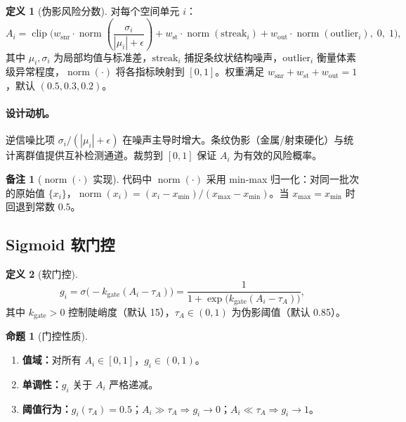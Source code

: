 \documentclass[11pt,a4paper]{article}
\newcommand{\sigmoid}{\sigma}
\newcommand{\clip}{\operatorname{clip}}
\newcommand{\normop}{\operatorname{norm}}
\theoremstyle{definition}
\newtheorem{definition}{定义}[section]
\newtheorem{proposition}{命题}[section]
\newtheorem{remark}{备注}[section]
\begin{document}
\begin{definition}[伪影风险分数]
对每个空间单元 $i$：
\begin{equation}\label{eq:artifact}
A_i = \clip\!\Bigg(
    w_{\mathrm{snr}} \cdot \normop\!\!\left(\frac{\sigma_i}{|\mu_i|+\epsilon}\right)
    + w_{\mathrm{st}} \cdot \normop(\mathrm{streak}_i)
    + w_{\mathrm{out}} \cdot \normop(\mathrm{outlier}_i),\;0,\;1
\Bigg),
\end{equation}
其中 $\mu_i, \sigma_i$ 为局部均值与标准差，$\mathrm{streak}_i$ 捕捉条纹状结构噪声，$\mathrm{outlier}_i$ 衡量体素级异常程度，$\normop(\cdot)$ 将各指标映射到 $[0,1]$。权重满足 $w_{\mathrm{snr}} + w_{\mathrm{st}} + w_{\mathrm{out}} = 1$，默认 $(0.5, 0.3, 0.2)$。
\end{definition}

\paragraph{设计动机。}
逆信噪比项 $\sigma_i/(|\mu_i|+\epsilon)$ 在噪声主导时增大。条纹伪影（金属/射束硬化）与统计离群值提供互补检测通道。裁剪到 $[0,1]$ 保证 $A_i$ 为有效的风险概率。

\begin{remark}[$\normop(\cdot)$ 实现]
代码中 $\normop(\cdot)$ 采用 min-max 归一化：对同一批次的原始值 $\{x_i\}$，$\normop(x_i) = (x_i - x_{\min}) / (x_{\max} - x_{\min})$。当 $x_{\max} = x_{\min}$ 时回退到常数 $0.5$。
\end{remark}


\subsection{Sigmoid 软门控}

\begin{definition}[软门控]
\begin{equation}\label{eq:gate}
g_i = \sigmoid\!\big(-k_{\mathrm{gate}}(A_i - \tau_A)\big)
    = \frac{1}{1 + \exp\!\big(k_{\mathrm{gate}}(A_i - \tau_A)\big)},
\end{equation}
其中 $k_{\mathrm{gate}} > 0$ 控制陡峭度（默认 15），$\tau_A \in (0,1)$ 为伪影阈值（默认 0.85）。
\end{definition}

\begin{proposition}[门控性质]\label{prop:gate}
\begin{enumerate}[label=(\roman*)]
    \item \textbf{值域：}对所有 $A_i \in [0,1]$，$g_i \in (0,1)$。
    \item \textbf{单调性：}$g_i$ 关于 $A_i$ 严格递减。
    \item \textbf{阈值行为：}$g_i(\tau_A) = 0.5$；$A_i \gg \tau_A \Rightarrow g_i \to 0$；$A_i \ll \tau_A \Rightarrow g_i \to 1$。
\end{enumerate}
\end{proposition}
\end{document}
